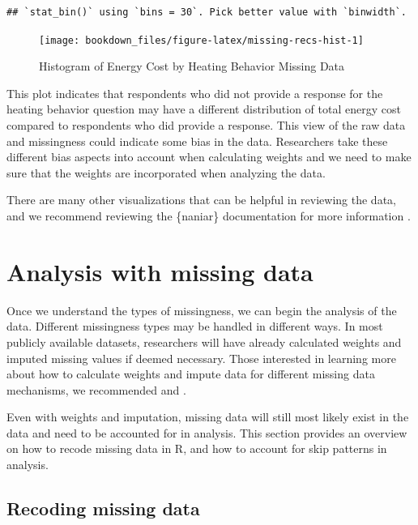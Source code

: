 \documentclass[
]{krantz}
\begin{document}
\begin{verbatim}
## `stat_bin()` using `bins = 30`. Pick better value with `binwidth`.
\end{verbatim}

\begin{figure}
\texttt{[image: bookdown\_files/figure-latex/missing-recs-hist-1]} \caption{Histogram of Energy Cost by Heating Behavior Missing Data}\label{fig:missing-recs-hist}
\end{figure}

This plot indicates that respondents who did not provide a response for the heating behavior question may have a different distribution of total energy cost compared to respondents who did provide a response. This view of the raw data and missingness could indicate some bias in the data. Researchers take these different bias aspects into account when calculating weights and we need to make sure that the weights are incorporated when analyzing the data.

There are many other visualizations that can be helpful in reviewing the data, and we recommend reviewing the \{naniar\} documentation for more information \citep{naniar}.

\hypertarget{analysis-with-missing-data}{%
\section{Analysis with missing data}\label{analysis-with-missing-data}}

Once we understand the types of missingness, we can begin the analysis of the data. Different missingness types may be handled in different ways. In most publicly available datasets, researchers will have already calculated weights and imputed missing values if deemed necessary. Those interested in learning more about how to calculate weights and impute data for different missing data mechanisms, we recommended \citet{Kim2021} and \citet{Valliant2018weights}.

Even with weights and imputation, missing data will still most likely exist in the data and need to be accounted for in analysis. This section provides an overview on how to recode missing data in R, and how to account for skip patterns in analysis.

\hypertarget{recoding-missing-data}{%
\subsection{Recoding missing data}\label{recoding-missing-data}}
\end{document}
